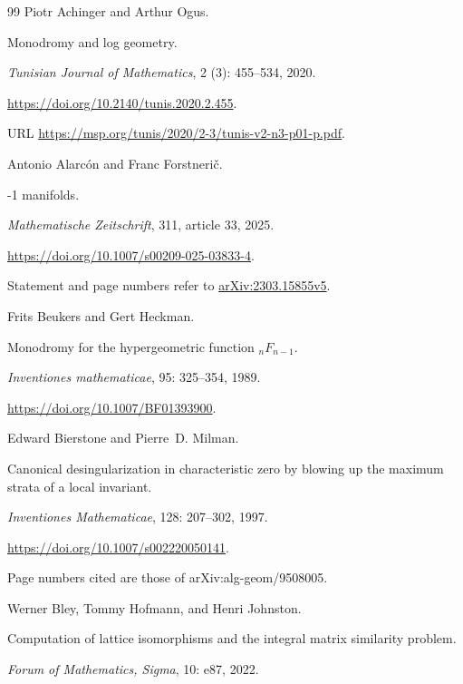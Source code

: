 \documentclass[11pt,a4paper]{article}
\numberwithin{equation}{section}
\theoremstyle{definition}
\begin{document}
\clearpage
\begin{thebibliography}{99}
\providecommand{\natexlab}[1]{#1}
\providecommand{\doi}[1]{\url{https://doi.org/#1}}
Piotr Achinger and Arthur Ogus.

\newblock Monodromy and log geometry.

\newblock \emph{Tunisian Journal of Mathematics}, 2 (3):
  455--534, 2020.

\newblock \doi{10.2140/tunis.2020.2.455}.

\newblock URL \url{https://msp.org/tunis/2020/2-3/tunis-v2-n3-p01-p.pdf}.

Antonio Alarc{\'o}n and Franc Forstneri{\v c}.

-1 manifolds.

\newblock \emph{Mathematische Zeitschrift}, 311, article 33, 2025.

\newblock \doi{10.1007/s00209-025-03833-4}.

\newblock Statement and page numbers refer to
\href{https://arxiv.org/pdf/2303.15855v5}{arXiv:2303.15855v5}.

Frits Beukers and Gert Heckman.

\newblock Monodromy for the hypergeometric function {$ {}_nF_{n-1}$}.

\newblock \emph{Inventiones mathematicae}, 95: 325--354, 1989.

\newblock \doi{10.1007/BF01393900}.

Edward Bierstone and Pierre~D. Milman.

\newblock Canonical desingularization in characteristic zero by blowing up the
  maximum strata of a local invariant.

\newblock \emph{Inventiones Mathematicae}, 128: 207--302, 1997.

\newblock \doi{10.1007/s002220050141}.

\newblock Page numbers cited are those of arXiv:alg-geom/9508005.

Werner Bley, Tommy Hofmann, and Henri Johnston.

\newblock Computation of lattice isomorphisms and the integral matrix
  similarity problem.

\newblock \emph{Forum of Mathematics, Sigma}, 10: e87, 2022.


\end{thebibliography}
\end{document}

